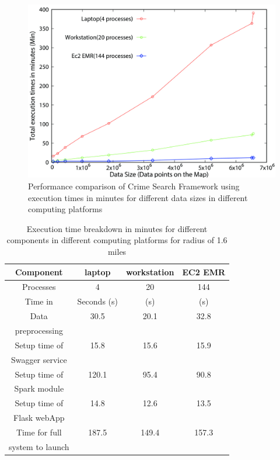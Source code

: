 \begin{figure}[htb]
	\centering\includegraphics[width=\columnwidth]
	{images/crime.jpg}
	\caption{Performance comparison of Crime
        Search Framework using execution times in
        minutes for different data sizes in different
        computing platforms}\label{fig:results-weakscaling}
\end{figure}

\begin{table}[htb]
	\centering
	\caption{Execution time breakdown in minutes for different
        components in different computing platforms for radius of
        1.6 miles }\label{tab:performance_component}
	\begin{tabular}{*{4}{c}}
		\toprule
		Component & laptop & workstation &  EC2 EMR \\
		\midrule
		Processes &  4  & 20 &  144 \\
		\midrule
		Time in & Seconds (s) & (s) &  (s) \\
		\midrule
		Data & 30.5  & 20.1 &  32.8 \\
		preprocessing  &   &  &   \\
		\midrule
		Setup time of  & 15.8  & 15.6 &  15.9 \\
		Swagger service  &   &  &   \\
		\midrule
		Setup time of  & 120.1  & 95.4 &  90.8 \\
		Spark module  &   &  &   \\
		\midrule
		Setup time of  & 14.8  & 12.6 &  13.5 \\
		Flask webApp  &   &  &   \\
		\midrule
		Time for full & 187.5  & 149.4 &  157.3 \\
		system to launch  &   &  &   \\
		\bottomrule
	\end{tabular}
\end{table}

